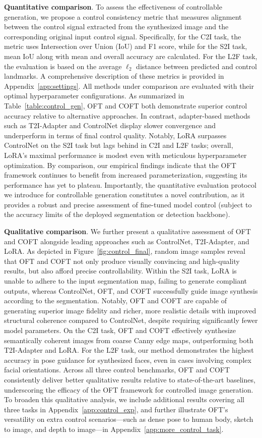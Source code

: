 \textbf{Quantitative comparison}. To assess the effectiveness of controllable generation, we propose a control consistency metric that measures alignment between the control signal extracted from the synthesized image and the corresponding original input control signal. Specifically, for the C2I task, the metric uses Intersection over Union (IoU) and F1 score, while for the S2I task, mean IoU along with mean and overall accuracy are calculated. For the L2F task, the evaluation is based on the average $\ell_2$ distance between predicted and control landmarks. A comprehensive description of these metrics is provided in Appendix~\ref{app:settings}. All methods under comparison are evaluated with their optimal hyperparameter configurations. As summarized in Table~\ref{table:control_gen}, OFT and COFT both demonstrate superior control accuracy relative to alternative approaches. In contrast, adapter-based methods such as T2I-Adapter and ControlNet display slower convergence and underperform in terms of final control quality. Notably, LoRA surpasses ControlNet on the S2I task but lags behind in C2I and L2F tasks; overall, LoRA’s maximal performance is modest even with meticulous hyperparameter optimization. By comparison, our empirical findings indicate that the OFT framework continues to benefit from increased parameterization, suggesting its performance has yet to plateau. Importantly, the quantitative evaluation protocol we introduce for controllable generation constitutes a novel contribution, as it provides a robust and precise assessment of fine-tuned model control (subject to the accuracy limits of the deployed segmentation or detection backbone).

\textbf{Qualitative comparison}. We further present a qualitative assessment of OFT and COFT alongside leading approaches such as ControlNet, T2I-Adapter, and LoRA. As depicted in Figure~\ref{fig:control_final}, random image samples reveal that OFT and COFT not only produce visually convincing and high-quality results, but also afford precise controllability. Within the S2I task, LoRA is unable to adhere to the input segmentation map, failing to generate compliant outputs, whereas ControlNet, OFT, and COFT successfully guide image synthesis according to the segmentation. Notably, OFT and COFT are capable of generating superior image fidelity and richer, more realistic details with improved structural coherence compared to ControlNet, despite requiring significantly fewer model parameters. On the C2I task, OFT and COFT effectively synthesize semantically coherent images from coarse Canny edge maps, outperforming both T2I-Adapter and LoRA. For the L2F task, our method demonstrates the highest accuracy in pose guidance for synthesized faces, even in cases involving complex facial orientations. Across all three control benchmarks, OFT and COFT consistently deliver better qualitative results relative to state-of-the-art baselines, underscoring the efficacy of the OFT framework for controlled image generation. To broaden this qualitative analysis, we include additional results covering all three tasks in Appendix~\ref{app:control_exp}, and further illustrate OFT’s versatility on extra control scenarios—such as dense pose to human body, sketch to image, and depth to image—in Appendix~\ref{app:more_control_task}.

